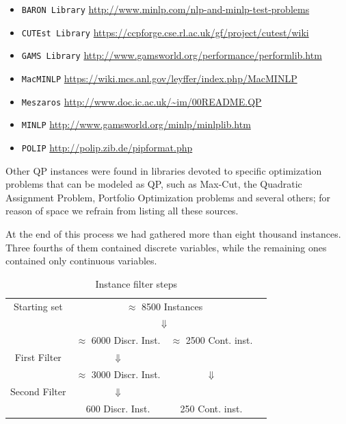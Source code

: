 \begin{itemize}
 \item {\tt BARON Library} \url{http://www.minlp.com/nlp-and-minlp-test-problems}
 \item {\tt CUTEst Library} \url{https://ccpforge.cse.rl.ac.uk/gf/project/cutest/wiki}
 \item {\tt GAMS Library} \url{http://www.gamsworld.org/performance/performlib.htm}
 \item {\tt MacMINLP} \url{https://wiki.mcs.anl.gov/leyffer/index.php/MacMINLP}
 \item {\tt Meszaros} \url{http://www.doc.ic.ac.uk/~im/00README.QP}
 \item {\tt MINLP} \url{http://www.gamsworld.org/minlp/minlplib.htm}
 \item {\tt POLIP} \url{http://polip.zib.de/pipformat.php}
\end{itemize}
%
Other QP instances were found in libraries devoted to specific optimization problems that can be modeled as QP, such as Max-Cut, the Quadratic Assignment Problem, Portfolio Optimization problems and several others; for reason of space we refrain from listing all these sources.

At the end of this process we had gathered more than eight thousand instances. Three fourths of them contained discrete variables, while the remaining ones contained only continuous variables.

\begin{center}
\begin{table}[]
 \centering

 \setlength{\tabcolsep}{5pt}
\begin{tabular}{cccc}
Starting set& \multicolumn{ 2}{c}{ $\approx$ 8500 Instances }& \\
& \multicolumn{ 2}{c}{$\Downarrow$}& \\
& $\approx$ 6000 Discr. Inst.  & $\approx$ 2500 Cont. inst. & \\
First Filter  & $\Downarrow$  &  & \\
 & $\approx$ 3000 Discr. Inst.  & $\Downarrow$ & \\
Second Filter & $\Downarrow$  &  & \\
 & 600 Discr. Inst.  & 250  Cont. inst. & \\
\end{tabular}
\caption{Instance filter steps} \label{tab:filters}
\end{table}
\end{center}

